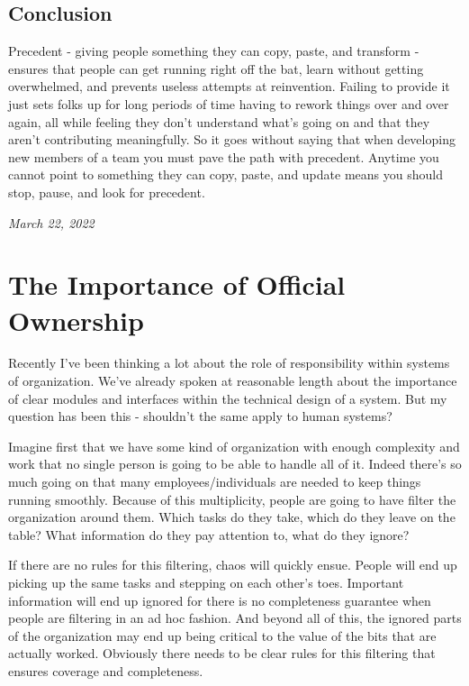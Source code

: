 \documentclass[10pt,a5paper]{book}
\begin{document}
\subsection{Conclusion}
Precedent - giving people something they can copy, paste, and transform - ensures that people can get running right off the bat, learn without getting overwhelmed, and prevents useless attempts at reinvention. Failing to provide it just sets folks up for long periods of time having to rework things over and over again, all while feeling they don't understand what's going on and that they aren't contributing meaningfully. So it goes without saying that when developing new members of a team you must pave the path with precedent. Anytime you cannot point to something they can copy, paste, and update means you should stop, pause, and look for precedent.

\textit{March 22, 2022}

\section{The Importance of Official Ownership}
Recently I've been thinking a lot about the role of responsibility within systems of organization. We've already spoken at reasonable length about the importance of clear modules and interfaces within the technical design of a system. But my question has been this - shouldn't the same apply to human systems?  

Imagine first that we have some kind of organization with enough complexity and work that no single person is going to be able to handle all of it. Indeed there's so much going on that many employees/individuals are needed to keep things running smoothly. Because of this multiplicity, people are going to have filter the organization around them. Which tasks do they take, which do they leave on the table? What information do they pay attention to, what do they ignore? 

If there are no rules for this filtering, chaos will quickly ensue. People will end up picking up the same tasks and stepping on each other's toes. Important information will end up ignored  for there is no completeness guarantee when people are filtering in an ad hoc fashion. And beyond all of this, the ignored parts of the organization may end up being critical to the value of the bits that are actually worked. Obviously there needs to be clear rules for this filtering that ensures coverage and completeness.
\end{document}
